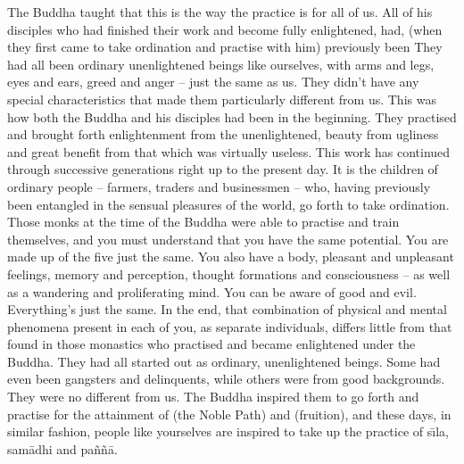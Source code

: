The Buddha taught that this is the way the practice is for all of us. All of his disciples who had finished their work and become fully enlightened, had, (when they first came to take ordination and practise with him) previously been  They had all been ordinary unenlightened beings like ourselves, with arms and legs, eyes and ears, greed and anger -- just the same as us. They didn't have any special characteristics that made them particularly different from us. This was how both the Buddha and his disciples had been in the beginning. They practised and brought forth enlightenment from the unenlightened, beauty from ugliness and great benefit from that which was virtually useless. This work has continued through successive generations right up to the present day. It is the children of ordinary people -- farmers, traders and businessmen -- who, having previously been entangled in the sensual pleasures of the world, go forth to take ordination. Those monks at the time of the Buddha were able to practise and train themselves, and you must understand that you have the same potential. You are made up of the five  just the same. You also have a body, pleasant and unpleasant feelings, memory and perception, thought formations and consciousness -- as well as a wandering and proliferating mind. You can be aware of good and evil. Everything's just the same. In the end, that combination of physical and mental phenomena present in each of you, as separate individuals, differs little from that found in those monastics who practised and became enlightened under the Buddha. They had all started out as ordinary, unenlightened beings. Some had even been gangsters and delinquents, while others were from good backgrounds. They were no different from us. The Buddha inspired them to go forth and practise for the attainment of  (the Noble Path) and  (fruition), and these days, in similar fashion, people like yourselves are inspired to take up the practice of s\={\i}la, sam\=adhi and pa\~n\~n\=a.

